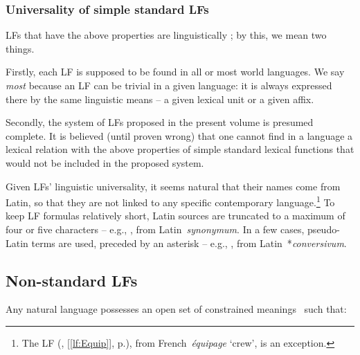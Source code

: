 \subsubsection{Universality of simple standard LFs}\label{sec:universality}

LFs that have the above properties are linguistically ; by this, we mean two things.

Firstly, each LF is supposed to be found in all or most world languages. We say \textit{most} because an LF can be trivial in a given language: it is always expressed there by the same linguistic means -- a given lexical unit or a given affix.

Secondly, the system of LFs proposed in the present volume is presumed complete. It is believed (until proven wrong) that one cannot find in a language a lexical relation with the above properties of simple standard lexical functions that would not be included in the proposed system.

Given\label{txt:LFNames} LFs' linguistic universality, it seems natural that their names come from Latin, so that they are not linked to any specific contemporary language.\footnote{The LF  (, [\ref{lf:Equip}], p.\thinspace\pageref{lf:Equip}), from {\smaller French}~\textit{équipage} `crew', is an exception.} To keep LF formulas relatively short, Latin sources are truncated to a maximum of four or five characters -- e.g., , from {\smaller Latin}~\textit{synonymum}. In a few cases, pseudo-Latin terms are used, preceded by an asterisk -- e.g., , from {\smaller Latin}~*\textit{conversivum}.

\subsection{Non-standard LFs}\label{par:nonStandardLFs}

Any natural language possesses an open set of constrained meanings \sigmaF\ such that:

